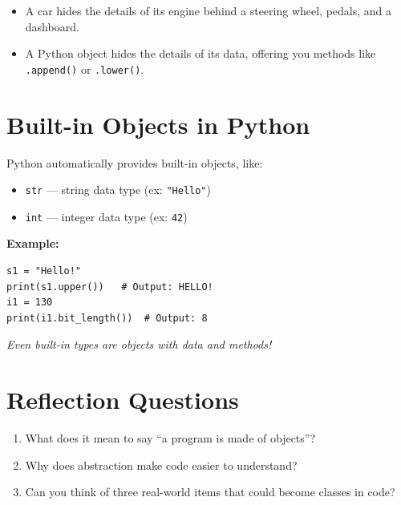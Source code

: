 \begin{itemize}
  \item A car hides the details of its engine behind a steering wheel, pedals, and a dashboard.
  \item A Python object hides the details of its data, offering you methods like \texttt{.append()} or \texttt{.lower()}.
\end{itemize}

\section{Built-in Objects in Python}

Python automatically provides built-in objects, like:
\begin{itemize}
  \item \texttt{str} — string data type (ex: \texttt{"Hello"})
  \item \texttt{int} — integer data type (ex: \texttt{42})
\end{itemize}

\textbf{Example:}
\begin{verbatim}
s1 = "Hello!"
print(s1.upper())   # Output: HELLO!
i1 = 130
print(i1.bit_length())  # Output: 8
\end{verbatim}

\textit{Even built-in types are objects with data and methods!}

\section*{Reflection Questions}

\begin{enumerate}
  \item What does it mean to say “a program is made of objects”?
  \item Why does abstraction make code easier to understand?
  \item Can you think of three real-world items that could become classes in code?
\end{enumerate}

